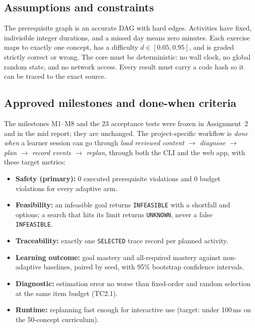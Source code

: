 \documentclass[11pt,a4paper]{article}
\begin{document}
\subsection{Assumptions and constraints}

The prerequisite graph is an accurate DAG with hard edges. Activities have fixed, indivisible integer durations, and a missed day means zero minutes. Each exercise maps to exactly one concept, has a difficulty $d\in[0.05,0.95]$, and is graded strictly correct or wrong. The core must be deterministic: no wall clock, no global random state, and no network access. Every result must carry a code hash so it can be traced to the exact source.

\subsection{Approved milestones and done-when criteria}

The milestones M1--M8 and the 23 acceptance tests were frozen in Assignment~2 and in the mid report; they are unchanged. The project-specific workflow is \emph{done when} a learner session can go through \emph{load reviewed content $\rightarrow$ diagnose $\rightarrow$ plan $\rightarrow$ record events $\rightarrow$ replan}, through both the CLI and the web app, with these target metrics:

\begin{itemize}
\item \textbf{Safety (primary):} 0 executed prerequisite violations and 0 budget violations for every adaptive arm.
\item \textbf{Feasibility:} an infeasible goal returns \texttt{INFEASIBLE} with a shortfall and options; a search that hits its limit returns \texttt{UNKNOWN}, never a false \texttt{INFEASIBLE}.
\item \textbf{Traceability:} exactly one \texttt{SELECTED} trace record per planned activity.
\item \textbf{Learning outcome:} goal mastery and all-required mastery against non-adaptive baselines, paired by seed, with 95\% bootstrap confidence intervals.
\item \textbf{Diagnostic:} estimation error no worse than fixed-order and random selection at the same item budget (TC2.1).
\item \textbf{Runtime:} replanning fast enough for interactive use (target: under 100\,ms on the 50-concept curriculum).
\end{itemize}
\end{document}
